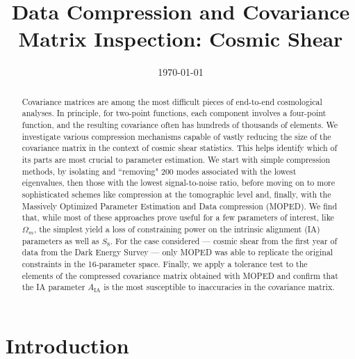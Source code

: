 \documentclass[aps, prd, twocolumn, superscriptaddress, nofootinbib, amssymb, amsmath]{revtex4-2}
\begin{document}
	
	\title{Data Compression and Covariance Matrix Inspection: Cosmic Shear}

	
	\date{\today}
	
\begin{abstract}
	Covariance matrices are among the most difficult pieces of end-to-end cosmological analyses. In principle, for two-point functions, each component involves a four-point function, and the resulting covariance often has hundreds of thousands of elements. We investigate various compression mechanisms capable of vastly reducing the size of the covariance matrix in the context of cosmic shear statistics.  This helps identify which of its parts are most crucial to parameter estimation. We start with simple compression methods, by isolating and ``removing" 200 modes associated with the lowest eigenvalues, then those with the lowest signal-to-noise ratio, before moving on to more sophisticated schemes like compression at the tomographic level and, finally, with the Massively Optimized Parameter Estimation and Data compression (MOPED). We find that, while most of these approaches prove useful for a few parameters of interest, like $\Omega_m$, the simplest yield a loss of constraining power on the intrinsic alignment (IA) parameters as well as $S_8$. For the case considered --- cosmic shear from the first year of data from the Dark Energy Survey --- only MOPED was able to replicate the original constraints in the 16-parameter space. Finally, we apply a tolerance test to the elements of the compressed covariance matrix obtained with MOPED and confirm that the IA parameter $A_{\text{IA}}$ is the most susceptible to inaccuracies in the covariance matrix.
\end{abstract}

\maketitle

\section{Introduction}\label{sec:introduction}
\end{document}
